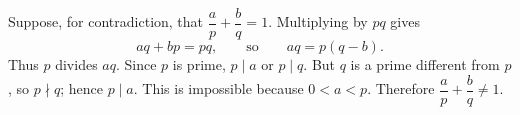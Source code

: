Suppose, for contradiction, that $\dfrac {a}{p}+\dfrac {b}{q}=1$. Multiplying by $pq$ gives
\[
aq+bp=pq,\qquad\text{so}\qquad aq=p(q-b).
\]
Thus $p$ divides $aq$. Since $p$ is prime, $p\mid a$ or $p\mid q$. But $q$ is a prime different from $p$, so $p\nmid q$; hence $p\mid a$. This is impossible because $0<a<p$. Therefore $\dfrac {a}{p}+\dfrac {b}{q}\ne1$.
